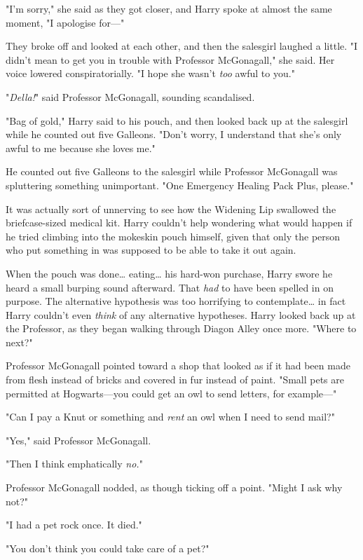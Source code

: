 "I'm sorry," she said as they got closer, and Harry spoke at almost the same 
moment, "I apologise for---"

They broke off and looked at each other, and then the salesgirl laughed a 
little. "I didn't mean to get you in trouble with Professor McGonagall," she 
said. Her voice lowered conspiratorially. "I hope she wasn't \emph{too} awful 
to you."

"\emph{Della!}" said Professor McGonagall, sounding scandalised.

"Bag of gold," Harry said to his pouch, and then looked back up at the 
salesgirl while he counted out five Galleons. "Don't worry, I understand that 
she's only awful to me because she loves me."

He counted out five Galleons to the salesgirl while Professor McGonagall was 
spluttering something unimportant. "One Emergency Healing Pack Plus, please."

It was actually sort of unnerving to see how the Widening Lip swallowed the 
briefcase-sized medical kit. Harry couldn't help wondering what would happen if 
he tried climbing into the mokeskin pouch himself, given that only the person 
who put something in was supposed to be able to take it out again.

When the pouch was done{\ldots} eating{\ldots} his hard-won purchase, Harry 
swore he heard a small burping sound afterward. That \emph{had} to have been 
spelled in on purpose. The alternative hypothesis was too horrifying to 
contemplate{\ldots} in fact Harry couldn't even \emph{think} of any alternative 
hypotheses. Harry looked back up at the Professor, as they began walking 
through Diagon Alley once more. "Where to next?"

Professor McGonagall pointed toward a shop that looked as if it had been made 
from flesh instead of bricks and covered in fur instead of paint. "Small pets 
are permitted at Hogwarts---you could get an owl to send letters, for 
example---"

"Can I pay a Knut or something and \emph{rent} an owl when I need to send mail?"

"Yes," said Professor McGonagall.

"Then I think emphatically \emph{no.}"

Professor McGonagall nodded, as though ticking off a point. "Might I ask why 
not?"

"I had a pet rock once. It died."

"You don't think you could take care of a pet?"

